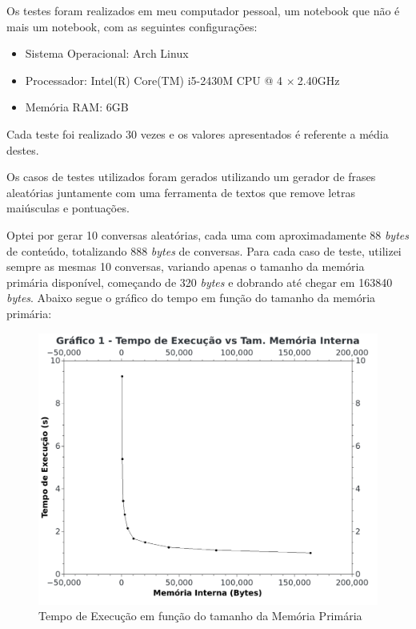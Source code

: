 \documentclass[
	12pt,
	a4paper,
	onepage,
	brazil
]{article}
\begin{document}
	Os testes foram realizados em meu computador pessoal, um notebook que não é mais um notebook, com as seguintes configurações:
	
	\begin{itemize}
		\item Sistema Operacional: Arch Linux
		\item Processador: Intel(R) Core(TM) i5-2430M CPU @ 4 $\times \ $2.40GHz
		\item Memória RAM: 6GB
	\end{itemize}
	
	Cada teste foi realizado 30 vezes e os valores apresentados é referente a média destes.
	
	Os casos de testes utilizados foram gerados utilizando um gerador de frases aleatórias \cite{lipsum} juntamente com uma ferramenta de textos \cite{texttool} que remove letras maiúsculas e pontuações.
	
	Optei por gerar 10 conversas aleatórias, cada uma com aproximadamente 88 \textit{bytes} de conteúdo, totalizando 888 \textit{bytes} de conversas. Para cada caso de teste, utilizei sempre as mesmas 10 conversas, variando apenas o tamanho da memória primária disponível, começando de 320 \textit{bytes} e dobrando até chegar em 163840 \textit{bytes}. Abaixo segue o gráfico do tempo em função do tamanho da memória primária:
	
	\begin{figure}[H]
		\centering
		\includegraphics[scale=2.5]{Graph1.png}
		\caption{Tempo de Execução em função do tamanho da Memória Primária}
	\end{figure}
	
\end{document}
